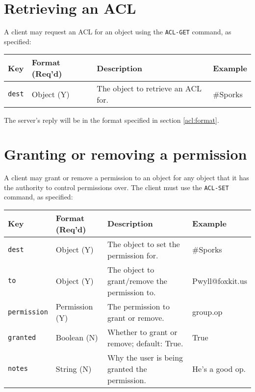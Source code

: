 \section{Retrieving an ACL}
\sectionrule

A client may request an ACL for an object using the \texttt{ACL-GET} command, as
specified:

\begin{tabular}{l|l|l|l}
  \hline
  Key           & Format (Req'd)& Description                           & Example \\
  \hline
  \hline
  \texttt{dest} & Object (Y)    & The object to retrieve an ACL for.    & \#Sporks \\
  \hline
\end{tabular}


The server's reply will be in the format specified in section \ref{acl:format}.



\section{Granting or removing a permission}
\sectionrule

A client may grant or remove a permission to an object for any object that it
has the authority to control permissions over.  The client must use the
\texttt{ACL-SET} command, as specified:

\begin{tabular}{l|l|l|l}
  \hline
  Key                   & Format (Req'd)& Description                                   & Example \\
  \hline
  \hline
  \texttt{dest}         & Object (Y)    & The object to set the permission for.         & \#Sporks \\
  \texttt{to}           & Object (Y)    & The object to grant/remove the permission to. & Pwyll@foxkit.us \\
  \texttt{permission}   & Permission (Y)& The permission to grant or remove.            & group.op \\
  \texttt{granted}      & Boolean (N)   & Whether to grant or remove; default: True.    & True \\
  \texttt{notes}        & String (N)    & Why the user is being granted the permission. & He's a good op. \\
  \hline
\end{tabular}
